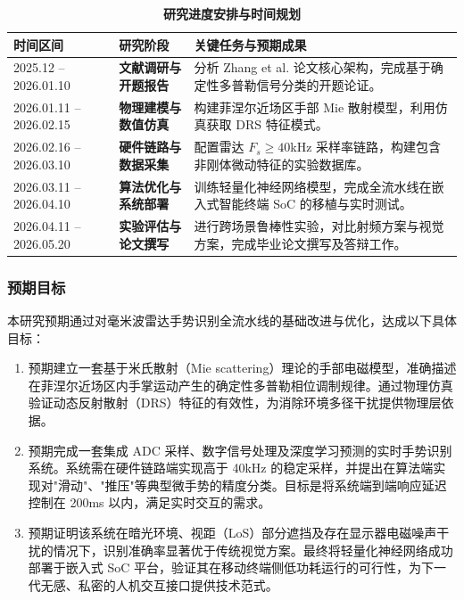 \begin{table}[htbp]
    \centering
    \caption{\bfseries 研究进度安排与时间规划}
    \vspace{3mm}
    \renewcommand{\arraystretch}{2.2} %
    \small
    \begin{tabularx}{\textwidth}{@{} l p{4.5cm} X @{}} %
        \toprule[1.5pt]
        \textbf{时间区间} & \textbf{研究阶段} & \textbf{关键任务与预期成果} \\
        \midrule

        2025.12 -- 2026.01.10 &
        \textbf{文献调研与开题报告} &
        分析 Zhang et al. 论文核心架构，完成基于确定性多普勒信号分类的开题论证。 \\

        2026.01.11 -- 2026.02.15 &
        \textbf{物理建模与数值仿真} &
        构建菲涅尔近场区手部 Mie 散射模型，利用仿真获取 DRS 特征模式。 \\

        2026.02.16 -- 2026.03.10 &
        \textbf{硬件链路与数据采集} &
        配置雷达 $F_s \ge 40$kHz 采样率链路，构建包含非刚体微动特征的实验数据库。 \\

        2026.03.11 -- 2026.04.10 &
        \textbf{算法优化与系统部署} &
        训练轻量化神经网络模型，完成全流水线在嵌入式智能终端 SoC 的移植与实时测试。 \\

        2026.04.11 -- 2026.05.20 &
        \textbf{实验评估与论文撰写} &
        进行跨场景鲁棒性实验，对比射频方案与视觉方案，完成毕业论文撰写及答辩工作。 \\

        \bottomrule[1.5pt]
    \end{tabularx}
    \label{tab:time_schedule_pro}
\end{table}

\subsubsection{预期目标}
本研究预期通过对毫米波雷达手势识别全流水线的基础改进与优化，达成以下具体目标：

\begin{enumerate}
    \item 预期建立一套基于米氏散射（Mie scattering）理论的手部电磁模型，准确描述在菲涅尔近场区内手掌运动产生的确定性多普勒相位调制规律。通过物理仿真验证动态反射散射（DRS）特征的有效性，为消除环境多径干扰提供物理层依据。
    \item 预期完成一套集成 ADC 采样、数字信号处理及深度学习预测的实时手势识别系统。系统需在硬件链路端实现高于 40kHz 的稳定采样，并提出在算法端实现对"滑动"、"推压"等典型微手势的精度分类。目标是将系统端到端响应延迟控制在 200ms 以内，满足实时交互的需求。
    \item 预期证明该系统在暗光环境、视距（LoS）部分遮挡及存在显示器电磁噪声干扰的情况下，识别准确率显著优于传统视觉方案。最终将轻量化神经网络成功部署于嵌入式 SoC 平台，验证其在移动终端侧低功耗运行的可行性，为下一代无感、私密的人机交互接口提供技术范式。
\end{enumerate}

